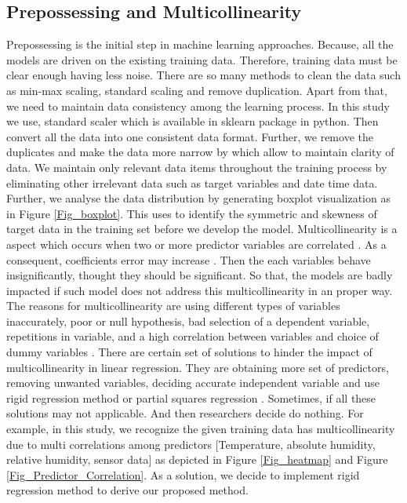 \subsection{Prepossessing and Multicollinearity}
Prepossessing is the initial step in machine learning approaches.
Because, all the models are driven on the existing training data. 
Therefore, training data must be clear enough having less noise.
There are so many methods to clean the data such as min-max scaling,
standard scaling and remove duplication.
Apart from that, we need to maintain data consistency among the learning process.
In this study we use, standard scaler which is available in sklearn package in python.
Then convert all the data into one consistent data format.
Further, we remove the duplicates and 
make the data more narrow by which allow to maintain clarity of data.
We maintain only relevant data items throughout the training process 
by eliminating other irrelevant data such as target variables and date time data.
Further, we analyse the data distribution 
by generating boxplot visualization as in Figure \ref{Fig_boxplot}.
This uses to identify the symmetric 
and skewness of target data in the training set before we develop the model.
Multicollinearity is a aspect which 
occurs when two or more predictor variables are correlated \cite{uyanik2013study}. 
As a consequent, coefficients error may increase \cite{uyanik2013study}.
Then the each variables behave insignificantly, 
thought they should be significant. 
So that, the models are badly impacted 
if such model does not address this multicollinearity in an proper way.
The reasons for multicollinearity are using different 
types of variables inaccurately,
poor or null hypothesis, bad selection of a dependent variable, 
repetitions in variable, and 
a high correlation between variables and 
choice of dummy variables \cite{farrar1967multicollinearity}.
There are certain set of solutions to 
hinder the impact of multicollinearity in linear regression.
They are obtaining more set of predictors, removing 
unwanted variables, deciding accurate independent variable 
and use rigid regression method or partial squares regression \cite{farrar1967multicollinearity}.
Sometimes, if all these solutions may not applicable.
And then researchers decide do nothing.
For example, in this study, 
we recognize the given training data has multicollinearity due to multi 
correlations among predictors [Temperature, absolute humidity, relative humidity, sensor data] 
as depicted in Figure \ref{Fig_heatmap} and Figure \ref{Fig_Predictor_Correlation}.
As a solution, we decide to implement rigid regression method 
to derive our proposed method.


